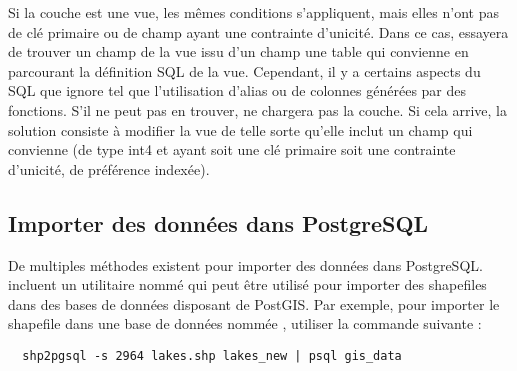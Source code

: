 Si la couche \psq est une vue, les mêmes conditions s'appliquent, mais elles n'ont pas de clé primaire ou de champ ayant une contrainte d'unicité. Dans ce cas, \qg essayera de trouver un champ de la vue issu d'un champ une table qui convienne en parcourant la définition SQL de la vue. Cependant, il y a certains aspects du SQL que \qg ignore tel que l'utilisation d'alias ou de colonnes générées par des fonctions. S'il ne peut pas en trouver, \qg ne chargera pas la couche. Si cela arrive, la solution consiste à modifier la vue de telle sorte qu'elle inclut un champ qui convienne (de type int4 et ayant soit une clé primaire soit une contrainte d'unicité, de préférence indexée).

\subsection{Importer des données dans PostgreSQL} \label{sec:loading_postgis_data}

De multiples méthodes existent pour importer des données dans PostgreSQL. \pg incluent un utilitaire nommé  qui peut être utilisé pour importer des shapefiles dans des bases de données disposant de PostGIS. Par exemple, pour importer le shapefile  dans une base de données \psq nommée , utiliser la commande suivante :

\begin{verbatim}
  shp2pgsql -s 2964 lakes.shp lakes_new | psql gis_data
\end{verbatim}

